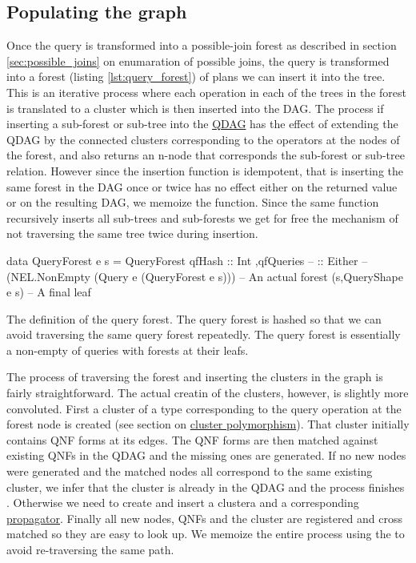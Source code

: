 \subsection{Populating the graph}

Once the query is transformed into a possible-join forest as described
in section \ref{sec:possible_joins} on enumaration of possible joins, the query
is transformed into a forest (listing \ref{lst:query_forest}) of plans we
can insert it into the tree. This is an iterative process where each
operation in each of the trees in the forest is translated to a
cluster which is then inserted into the DAG. The process if inserting
a sub-forest or sub-tree into the \hyperref[sec:org5a9ec3b]{QDAG} has
the effect of extending the QDAG by the connected clusters
corresponding to the operators at the nodes of the forest, and also
returns an n-node that corresponds the sub-forest or sub-tree
relation. However since the insertion function is idempotent, that is
inserting the same forest in the DAG once or twice has no effect
either on the returned value or on the resulting DAG, we memoize the
function. Since the same function recursively inserts all sub-trees
and sub-forests we get for free the mechanism of not traversing the
same tree twice during insertion.

\begin{code}
  \begin{haskellcode}
    data QueryForest e s =
      QueryForest
      { qfHash :: Int
        ,qfQueries --
        :: Either --
        (NEL.NonEmpty (Query e (QueryForest e s))) -- An actual forest
        (s,QueryShape e s) -- A final leaf
      }
  \end{haskellcode}
  \label{lst:query_forest}
  \caption{The definition of the query forest. The
    query forest is hashed so that we can avoid traversing the same
    query forest repeatedly. The query forest is essentially a
    non-empty of queries with forests at their leafs.}
\end{code}

The process of traversing the forest and inserting the clusters in the
graph is fairly straightforward. The actual creatin of the clusters,
however, is slightly more convoluted. First a cluster of a type
corresponding to the query operation at the forest node is created
(see section on \hyperref[sec:orgadee761]{cluster polymorphism}). That
cluster initially contains QNF forms at its edges. The QNF forms are
then matched against existing QNFs in the QDAG and the missing ones
are generated. If no new nodes were generated and the matched nodes
all correspond to the same existing cluster, we infer that the cluster
is already in the QDAG and the process finishes . Otherwise we need to
create and insert a clustera and a corresponding
\hyperref[sec:org089acdd]{propagator}. Finally all new nodes, QNFs and
the cluster are registered and cross matched so they are easy to look
up. We memoize the entire process using the  to avoid
re-traversing the same path.


